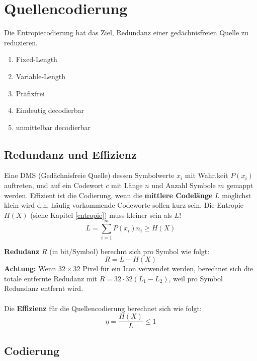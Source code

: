 \section{Quellencodierung}
Die Entropiecodierung hat das Ziel, Redundanz einer gedächnisfreien Quelle zu reduzieren. 
\begin{enumerate}[nosep]
	\item Fixed-Length
	\item Variable-Length
	\item Präfixfrei
	\item Eindeutig decodierbar
	\item unmittelbar decodierbar
\end{enumerate}

\subsection{Redundanz und Effizienz}\label{redundanz}
 Eine DMS (Gedächnisfreie Quelle) dessen Symbolwerte $x_i$ mit Wahr.keit $P(x_i)$ auftreten, und auf ein Codewort $c$ mit Länge $n$ und Anzahl Symbole $m$ gemappt werden. Effizient ist die Codierung, wenn die \textbf{mittlere Codelänge} $L$ möglichst klein wird d.h. häufig vorkommende Codeworte sollen kurz sein. Die Entropie $H(X)$ (siehe Kapitel \ref{entropie}) muss kleiner sein als $L$!
\[
L = \sum_{i=1}^{m}P(x_i)n_i \ge H(X)
\]

\noindent\textbf{Redudanz} $R$ (in bit/Symbol) berechnt sich pro Symbol wie folgt:
\[
R = L - H(X)
\]
\textbf{Achtung:} Wenn $32\times32$ Pixel für ein Icon verwendet werden, berechnet sich die totale entfernte Redudanz mit $R = 32\cdot32(L_1 - L_2)$, weil pro Symbol Redundanz entfernt wird.~\\~\\


\noindent Die \textbf{Effizienz} für die Quellencodierung berechnet sich wie folgt:
\[
\eta = \frac{H(X)}{L} \le 1
\]

\subsection{Codierung}
